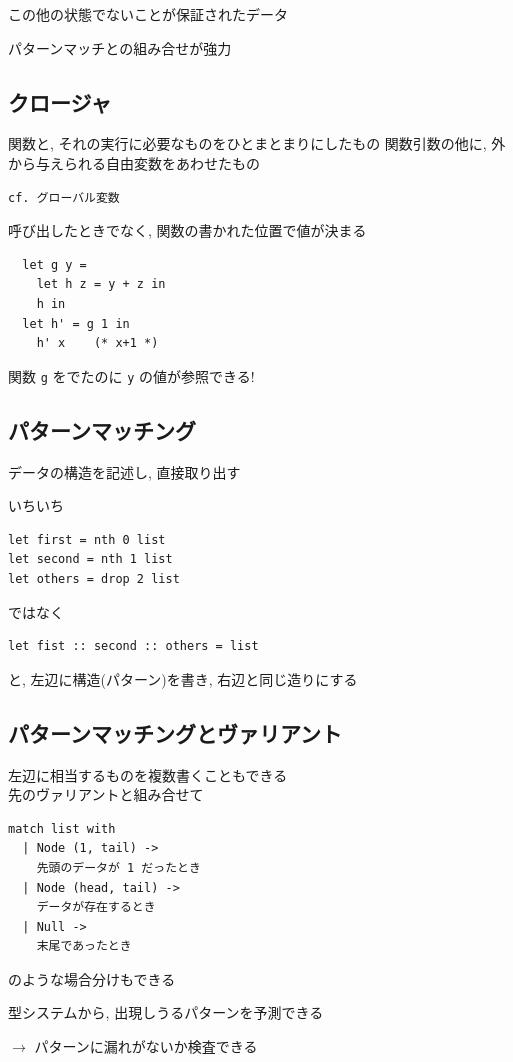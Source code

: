 \documentclass[papersize,30pt,slide]{jsarticle}
\begin{document}
この他の状態でないことが保証されたデータ

パターンマッチとの組み合せが強力

\newpage
\subsection{クロージャ}
関数と, それの実行に必要なものをひとまとまりにしたもの
関数引数の他に, 外から与えられる自由変数をあわせたもの

\begin{verbatim}
cf. グローバル変数
\end{verbatim}
呼び出したときでなく, 関数の書かれた位置で値が決まる

\begin{lstlisting}
  let g y =
    let h z = y + z in
    h in
  let h' = g 1 in
    h' x    (* x+1 *)
\end{lstlisting}
関数 \lstinline|g| をでたのに \lstinline|y| の値が参照できる!

\newpage
\subsection{パターンマッチング}
データの構造を記述し, 直接取り出す

いちいち
\begin{lstlisting}
let first = nth 0 list
let second = nth 1 list
let others = drop 2 list
\end{lstlisting}
ではなく
\begin{lstlisting}
let fist :: second :: others = list
\end{lstlisting}
と, 左辺に構造(パターン)を書き, 右辺と同じ造りにする

\newpage
\subsection{パターンマッチングとヴァリアント}
左辺に相当するものを複数書くこともできる \\
先のヴァリアントと組み合せて
\begin{lstlisting}
match list with
  | Node (1, tail) ->
    先頭のデータが 1 だったとき
  | Node (head, tail) ->
    データが存在するとき
  | Null ->
    末尾であったとき
\end{lstlisting}
のような場合分けもできる

型システムから, 出現しうるパターンを予測できる 

\hspace{1em} $\rightarrow$ パターンに漏れがないか検査できる
\end{document}
